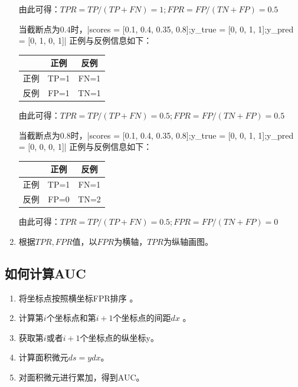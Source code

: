 \begin{enumerate}
		由此可得：$TPR = TP/(TP+FN) = 1; FPR = FP/(TN+FP) = 0.5$

		当截断点为0.4时，\li|scores = [0.1, 0.4, 0.35, 0.8];y_true = [0, 0, 1, 1];y_pred = [0, 1, 0, 1]| 正例与反例信息如下：

			\begin{table}[h]
				\centering
				\begin{tabular}{|c|c|c|}\hline
					& 正例 & 反例 \\\hline
					正例  & TP=1 & FN=1\\\hline
					反例  & FP=1 & TN=1\\\hline
				\end{tabular}
			\end{table}

		由此可得：$TPR = TP/(TP+FN) = 0.5; FPR = FP/(TN+FP) = 0.5$

		当截断点为0.8时，\li|scores = [0.1, 0.4, 0.35, 0.8];y_true = [0, 0, 1, 1];y_pred = [0, 0, 0, 1]| 正例与反例信息如下：

			\begin{table}[h]
				\centering
				\begin{tabular}{|c|c|c|}\hline
					& 正例 & 反例 \\\hline
					正例  & TP=1 & FN=1\\\hline
					反例  & FP=0 & TN=2\\\hline
				\end{tabular}
			\end{table}

由此可得：$TPR = TP/(TP+FN) = 0.5; FPR = FP/(TN+FP) = 0$

\item 根据$TPR,FPR$值，以$FPR$为横轴，$TPR$为纵轴画图。
\end{enumerate}

\subsection{如何计算AUC}

\begin{enumerate}\itemsep0em
		\item 将坐标点按照横坐标FPR排序 。
		\item 计算第$i$个坐标点和第$i+1$个坐标点的间距$dx$ 。
		\item 获取第$i$或者$i+1$个坐标点的纵坐标y。
		\item 计算面积微元$ds=ydx$。
		\item 对面积微元进行累加，得到AUC。
\end{enumerate}



